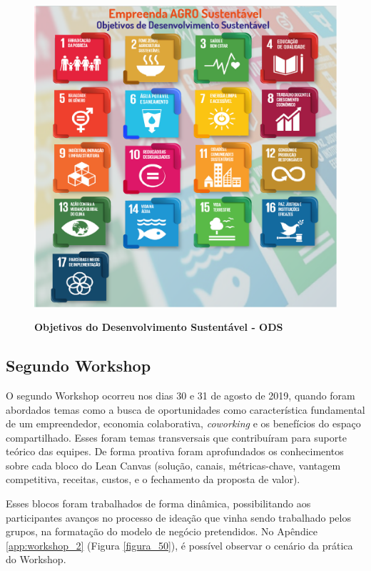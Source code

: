\begin{figure}[H]
\centering
\caption{\textbf{Objetivos do Desenvolvimento Sustentável - ODS}}
\includegraphics[scale=0.2]{Imagens/ODS_GERAL.png}
\label{fig:ods}
\end{figure}


\subsection{Segundo Workshop}


O segundo Workshop ocorreu nos dias 30 e 31 de agosto de 2019, quando foram abordados temas como a busca de oportunidades como característica fundamental de um empreendedor, economia colaborativa, \textit{coworking} e os benefícios do espaço compartilhado. Esses foram temas transversais que contribuíram para suporte teórico das equipes. De forma proativa foram aprofundados os conhecimentos sobre cada bloco do Lean Canvas (solução, canais, métricas-chave, vantagem competitiva, receitas, custos, e o fechamento da proposta de valor). 

Esses blocos foram trabalhados de forma dinâmica, possibilitando aos participantes avanços no processo de ideação que vinha sendo trabalhado pelos grupos, na formatação do modelo de negócio pretendidos. No Apêndice \ref{app:workshop_2}  (Figura \ref{figura_50}), 
é possível observar o cenário da prática do Workshop.
 

